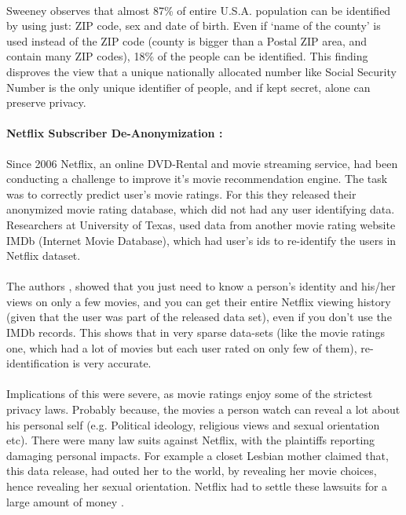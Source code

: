 \documentclass[12pt]{report}
\theoremstyle{named}
\begin{document}
\paragraph{}
Sweeney observes that almost 87\% of entire U.S.A. population can be identified by using just: ZIP code, sex and date of birth. Even if `name of the county' is used instead of the ZIP code (county is bigger than a Postal ZIP area, and contain many ZIP codes), 18\% of the people can be identified. This finding disproves the view that a unique nationally allocated number like Social Security Number is the only unique identifier of people, and if kept secret, alone can preserve privacy.


\paragraph{Netflix Subscriber De-Anonymization \cite{narayanan2008robust}:\\}
Since 2006 Netflix, an online DVD-Rental and movie streaming service, had been conducting a challenge to improve it's movie recommendation engine. The task was to correctly predict user's movie ratings. For this they released their anonymized movie rating database, which did not had any user identifying data. Researchers at University of Texas, used data from another movie rating website IMDb (Internet Movie Database), which had user's ids to re-identify the users in Netflix dataset.
\paragraph{}
The authors \cite{narayanan2008robust}, showed that you just need to know a person's identity and his/her views on only a few movies, and you can get their entire Netflix viewing history (given that the user was part of the released data set), even if you don't use the IMDb records. This shows that in very sparse data-sets (like the movie ratings one, which had a lot of movies but each user rated on only few of them), re-identification is very accurate.

\paragraph{}
Implications of this were severe, as movie ratings enjoy some of the strictest privacy laws. Probably because, the movies a person watch can reveal a lot about his personal self (e.g. Political ideology, religious views and sexual orientation etc). There were many law suits against Netflix, with the plaintiffs reporting damaging personal impacts. For example a closet Lesbian mother claimed that, this data release, had outed her to the world, by revealing her movie choices, hence revealing her sexual orientation. Netflix had to settle these lawsuits for a large amount of money \cite{netFlixSetlement}.
\end{document}
